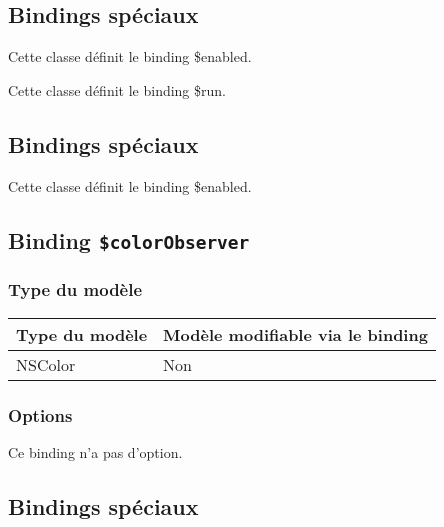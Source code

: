 
\subsection{Bindings spéciaux}

Cette classe définit le binding \$enabled.

Cette classe définit le binding \$run.









\subsection{Bindings spéciaux}

Cette classe définit le binding \$enabled.

\subsection{Binding \texttt{\$colorObserver}}

\subsubsection{Type du modèle}

\begin{tabular}{|l|l|}
\hline
\textbf{Type du modèle} & \textbf{Modèle modifiable via le binding}\\
\hline
NSColor & Non\\
\hline
\end{tabular}
\subsubsection{Options}

Ce binding n'a pas d'option.









\subsection{Bindings spéciaux}

